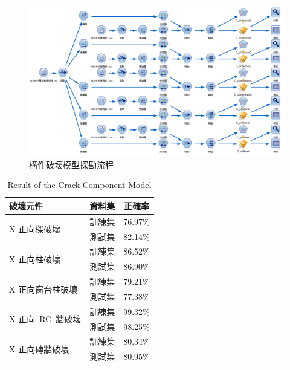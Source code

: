\begin{figure}[hbtp]
  \begin{center}
    \includegraphics[width=1.0\textwidth]{figures/crack-flow.png}
    \caption{構件破壞模型探勘流程} 
    \label{fig:crack-flow}
  \end{center}
\end{figure}


\setlength{\tabcolsep}{2em}
\begin{table}[hbtp]
  \begin{center}
    \caption{Result of the Crack Component Model}
    \label{tab:comp_result}
    \begin{tabular}{l c c}
    	\hline
    	破壞元件 & 資料集 & 正確率 \\
    	\hline
    	\multirow{2}{*}{X 正向樑破壞} & 訓練集 & 76.97\% \\
    	\cline{2-3} & 測試集 & 82.14\% \\
    	\hline
    	\multirow{2}{*}{X 正向柱破壞} & 訓練集 & 86.52\% \\
    	\cline{2-3} & 測試集 & 86.90\% \\
    	\hline
    	\multirow{2}{*}{X 正向窗台柱破壞} & 訓練集 & 79.21\% \\
    	\cline{2-3} & 測試集 & 77.38\% \\
    	\hline
    	\multirow{2}{*}{X 正向~RC~牆破壞} & 訓練集 & 99.32\% \\
    	\cline{2-3} & 測試集 & 98.25\% \\
    	\hline
    	\multirow{2}{*}{X 正向磚牆破壞} & 訓練集 & 80.34\% \\
    	\cline{2-3} & 測試集 & 80.95\% \\
    	\hline
    \end{tabular}
  \end{center}
\end{table}


